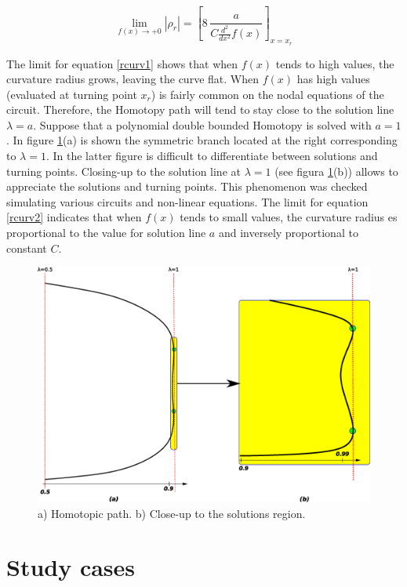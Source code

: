 \documentclass[conference,letterpaper,onecolumn]{IEEEtran}
\begin{document}
{\begin{equation}
 \displaystyle\lim_{f(x) \to{+}0}{|\rho_{r}|}= \left[8\,{\frac {a}{C{\frac {d^{2}}{d{x}^{2}}}f \left( x \right) }} \right]_{x=x_r} 
  \label{rcurv2}
\end{equation}

The limit for equation \ref{rcurv1} shows that when $f(x)$ tends to high values, the curvature radius grows, leaving the curve flat. When $f(x)$ has high values (evaluated at turning point $x_r$) is fairly common on the nodal equations of the circuit. Therefore, the Homotopy path will tend to stay close to the solution line $\lambda=a$. Suppose that a polynomial double bounded Homotopy is solved with $a=1$. In figure \ref{fig:xxx1}(a) is shown the symmetric branch located at the right corresponding to $\lambda=1$. In the latter figure is difficult to differentiate between solutions and turning points. Closing-up to the solution line at $\lambda=1$ (see figura \ref{fig:xxx1}(b)) allows to appreciate the solutions and turning points. This phenomenon was checked simulating various circuits and non-linear equations. The limit for equation \ref{rcurv2} indicates that when $f(x)$ tends to small values, the curvature radius es proportional to the value for solution line $a$ and inversely proportional to constant $C$.

\begin{figure}[hbtp]
\centering
\includegraphics[scale=0.4]{figs/curvatura.eps}
\caption{a) Homotopic path. b) Close-up to the solutions region.}
\label{fig:xxx1}
\end{figure}

\section{Study cases}

}
\end{document}

